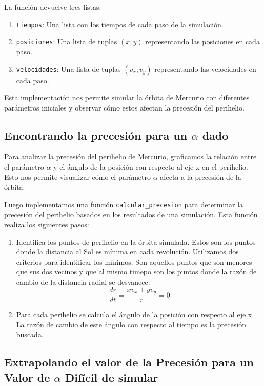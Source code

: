 \documentclass[twocolumn]{article}
\begin{document}
La función devuelve tres listas:
\begin{enumerate}
    \item \texttt{tiempos}: Una lista con los tiempos de cada paso de la simulación.
    \item \texttt{posiciones}: Una lista de tuplas $(x, y)$ representando las posiciones en cada paso.
    \item \texttt{velocidades}: Una lista de tuplas $(v_x, v_y)$ representando las velocidades en cada paso.
\end{enumerate}

Esta implementación nos permite simular la órbita de Mercurio con diferentes parámetros iniciales y observar cómo estos afectan la precesión del perihelio.

\subsection*{Encontrando la precesión para un $\alpha$ dado}

Para analizar la precesión del perihelio de Mercurio, graficamos la relación entre el parámetro $\alpha$ y el ángulo de la posición con respecto al eje x en el perihelio. Esto nos permite visualizar cómo el parámetro $\alpha$ afecta a la precesión de la órbita.

Luego implementamos una función \texttt{calcular\_precesion} para determinar la precesión del perihelio basados en los resultados de una simulación. Esta función realiza los siguientes pasos:

\begin{enumerate}
    \item Identifica los puntos de perihelio en la órbita simulada. Estos son los puntos donde la distancia al Sol es mínima en cada revolución. Utilizamos dos criterios para identificar los mínimos:
    Son aquellos puntos que son menores que sus dos vecinos y que al mismo timepo son los puntos donde la razón de cambio de la distancia radial se desvanece:
    \begin{equation}
    \frac{dr}{dt} = \frac{xv_x + yv_y}{r} = 0
    \end{equation}
     \item Para cada perihelio se calcula el ángulo de la posición con respecto al eje x. La razón de cambio de este ángulo con respecto al tiempo es la precesión buscada.
\end{enumerate}

\subsection*{Extrapolando el valor de la Precesión para un Valor de $\alpha$ Difícil de simular}
\end{document}

